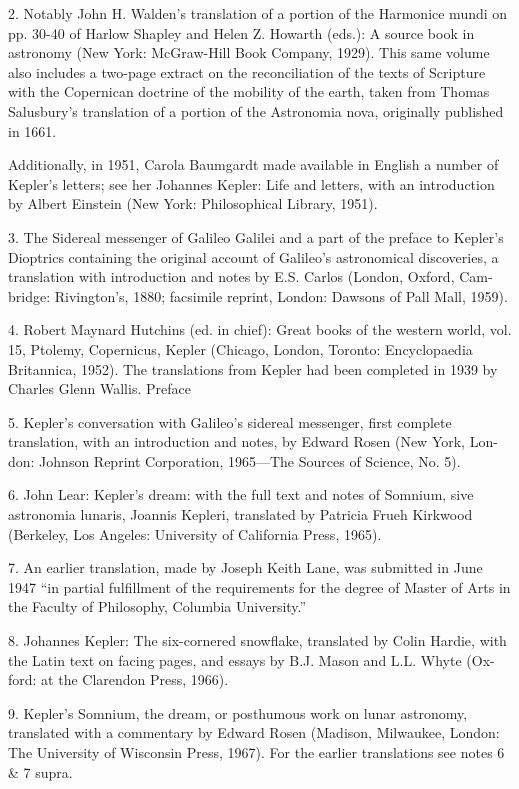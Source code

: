 \documentclass{article}
\begin{document}
2. Notably John H. Walden’s translation of a portion of the Harmonice mundi
on pp. 30-40 of Harlow Shapley and Helen Z. Howarth (eds.): A source book in
astronomy (New York: McGraw-Hill Book Company, 1929). This same volume
also includes a two-page extract on the reconciliation of the texts of Scripture with
the Copernican doctrine of the mobility of the earth, taken from Thomas
Salusbury’s translation of a portion of the Astronomia nova, originally published
in 1661.

Additionally, in 1951, Carola Baumgardt made available in English a number of
Kepler's letters; see her Johannes Kepler: Life and letters, with an introduction by
Albert Einstein (New York: Philosophical Library, 1951).

3. The Sidereal messenger of Galileo Galilei and a part of the preface to Kepler's
Dioptrics containing the original account of Galileo’s astronomical discoveries, a
translation with introduction and notes by E.S. Carlos (London, Oxford, Cam-
bridge: Rivington’s, 1880; facsimile reprint, London: Dawsons of Pall Mall, 1959).

4. Robert Maynard Hutchins (ed. in chief): Great books of the western world,
vol. 15, Ptolemy, Copernicus, Kepler (Chicago, London, Toronto: Encyclopaedia
Britannica, 1952). The translations from Kepler had been completed in 1939 by
Charles Glenn Wallis.
Preface

5. Kepler's conversation with Galileo’s sidereal messenger, first complete
translation, with an introduction and notes, by Edward Rosen (New York, Lon-
don: Johnson Reprint Corporation, 1965—The Sources of Science, No. 5).

6. John Lear: Kepler’s dream: with the full text and notes of Somnium, sive
astronomia lunaris, Joannis Kepleri, translated by Patricia Frueh Kirkwood
(Berkeley, Los Angeles: University of California Press, 1965).

7. An earlier translation, made by Joseph Keith Lane, was submitted in June
1947 “in partial fulfillment of the requirements for the degree of Master of Arts in
the Faculty of Philosophy, Columbia University.”

8. Johannes Kepler: The six-cornered snowflake, translated by Colin Hardie,
with the Latin text on facing pages, and essays by B.J. Mason and L.L. Whyte (Ox-
ford: at the Clarendon Press, 1966).

9. Kepler's Somnium, the dream, or posthumous work on lunar astronomy,
translated with a commentary by Edward Rosen (Madison, Milwaukee, London:
The University of Wisconsin Press, 1967). For the earlier translations see notes 6 &
7 supra.
\end{document}
